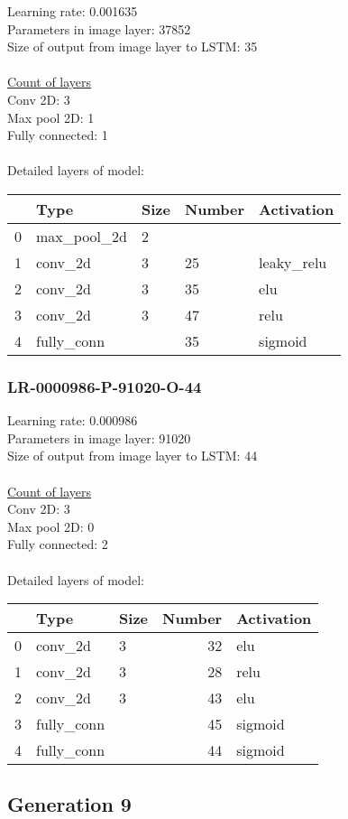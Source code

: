 Learning rate: 0.001635
\\Parameters in image layer: 37852
\\Size of output from image layer to LSTM: 35
\\\\\underline{Count of layers} 
\\Conv 2D:           3\\Max pool 2D:      1\\Fully connected:  1
\\\\Detailed layers of model: \\\begin{tabular}{rllll}
\hline
    & Type        & Size   & Number   & Activation   \\
\hline
  0 & max\_pool\_2d & 2      &          &              \\
  1 & conv\_2d     & 3      & 25       & leaky\_relu   \\
  2 & conv\_2d     & 3      & 35       & elu          \\
  3 & conv\_2d     & 3      & 47       & relu         \\
  4 & fully\_conn  &        & 35       & sigmoid      \\
\hline
\end{tabular}\subsubsection*{LR-0000986-P-91020-O-44}
Learning rate: 0.000986
\\Parameters in image layer: 91020
\\Size of output from image layer to LSTM: 44
\\\\\underline{Count of layers} 
\\Conv 2D:           3\\Max pool 2D:      0\\Fully connected:  2
\\\\Detailed layers of model: \\\begin{tabular}{rllrl}
\hline
    & Type       & Size   &   Number & Activation   \\
\hline
  0 & conv\_2d    & 3      &       32 & elu          \\
  1 & conv\_2d    & 3      &       28 & relu         \\
  2 & conv\_2d    & 3      &       43 & elu          \\
  3 & fully\_conn &        &       45 & sigmoid      \\
  4 & fully\_conn &        &       44 & sigmoid      \\
\hline
\end{tabular}\subsection{Generation 9}
